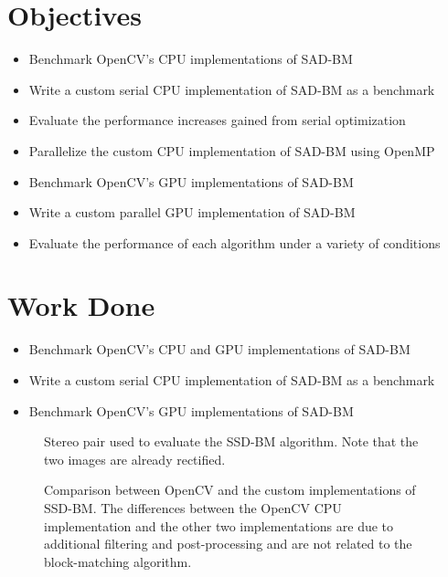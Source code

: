 \documentclass{article}
\begin{document}
\section{Objectives}
\begin{itemize}
\item Benchmark OpenCV's CPU implementations of SAD-BM
\item Write a custom serial CPU implementation of SAD-BM as a benchmark
\item Evaluate the performance increases gained from serial optimization
\item Parallelize the custom CPU implementation of SAD-BM using OpenMP
\item Benchmark OpenCV's GPU implementations of SAD-BM
\item Write a custom parallel GPU implementation of SAD-BM
\item Evaluate the performance of each algorithm under a variety of conditions
\end{itemize}

\section{Work Done}
\begin{itemize}
\item Benchmark OpenCV's CPU and GPU implementations of SAD-BM
\item Write a custom serial CPU implementation of SAD-BM as a benchmark
\item Benchmark OpenCV's GPU implementations of SAD-BM
\end{itemize}

\begin{figure}[H]
	\centering
	\caption{
		Stereo pair used to evaluate the SSD-BM algorithm. Note that the two
		images are already rectified.
	}
\end{figure}

\begin{figure}[H]
	\centering
	\caption{
		Comparison between OpenCV and the custom implementations of SSD-BM. The differences
		between the OpenCV CPU implementation and the other two implementations are due to
		additional filtering and post-processing and are not related to the block-matching
		algorithm.
	}
\end{figure}
\end{document}

